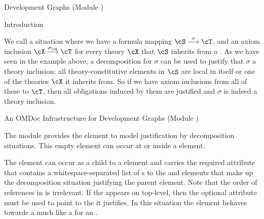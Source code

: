 \begin{omgroup}[id=complex-theories,short=Complex Theories,
                            creators=miko,contributors=frabe]
\begin{omgroup}[id=development-graphs,short=Development Graphs]{Development Graphs (Module
  {})}
\begin{module}[id=dgraph]
\begin{omgroup}[id=dg-intro,short=Introduction]{Introduction}
\begin{omtext}
We call a situation where we have a formula mapping
$\cS\stackrel\sigma\longrightarrow\cT$, and an axiom inclusion
$\cX\stackrel{\sigma_\cX}\longrightarrow\cT$ for every theory $\cX$ that $\cS$ inherits
from a . As we have seen in the example above, a decomposition for $\sigma$ can
be used to justify that $\sigma$ a theory inclusion: all theory-constitutive elements in
$\cS$ are local in itself or one of the theories $\cX$ it inherits from. So if we have
axiom inclusions from all of these to $\cT$, then all obligations induced by them are
justified and $\sigma$ is indeed a theory inclusion.
\end{omtext}
\end{omgroup}

\begin{omgroup}[id=dg-omdoc,short=OMDoc Development Graphs]{An OMDoc Infrastructure for
  Development Graphs (Module {})}
  
\begin{definition}[id=decomposition.def]
  The {} module provides the {} element to model
  justification by decomposition situations.  This empty element can occur at
  {} or inside a {} element.
 
  The {} element can occur as a child to a
  {} element and carries the required attribute
  {} that contains a whitespace-separated list of
  {s} to the {} and {}
  elements that make up the decomposition situation justifying the parent
  {} element. Note that the order of references in
  {} is irrelevant. If the {}
  appears on top-level, then the optional {} attribute must
  be used to point to the {} it justifies. In this situation the
  {} element behaves towards a {} much
  like a {} for an {}.
\end{definition}


\end{omgroup}
\end{module}
\end{omgroup}
\end{omgroup}

